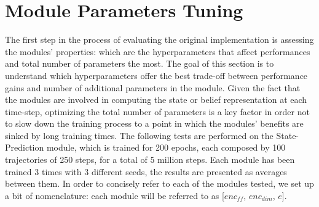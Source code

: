                 
    \newpage
    \section{Module Parameters Tuning}
    \label{results:module_tuning}
        The first step in the process of evaluating the original implementation is assessing the modules' properties: which are the hyperparameters that affect performances and total number of parameters the most. The goal of this section is to understand which hyperparameters offer the best trade-off between performance gains and number of additional parameters in the module. Given the fact that the modules are involved in computing the state or belief representation at each time-step, optimizing the total number of parameters is a key factor in order not to slow down the training process to a point in which the modules' benefits are sinked by long training times. \newline
        The following tests are performed on the State-Prediction module, which is trained for 200 epochs, each composed by 100 trajectories of 250 steps, for a total of 5 million steps. Each module has been trained 3 times with 3 different seeds, the results are presented as averages between them. In order to concisely refer to each of the modules tested, we set up a bit of nomenclature: each module will be referred to as [$enc_{ff}$, $enc_{dim}$, $e$]. 
        
